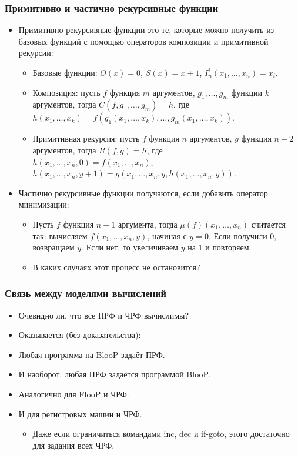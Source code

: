 \documentclass[10pt]{beamer}
\begin{document}
\begin{frame}
    \frametitle{Примитивно и частично рекурсивные функции}
    \begin{itemize}
        \item Примитивно рекурсивные функции это те, которые можно получить из базовых функций с помощью операторов композиции и примитивной рекурсии:
        \begin{itemize}
            \item Базовые функции: $O(x) = 0$, $S(x) = x+1$, $I_n^i(x_1, \ldots, x_n) = x_i$.
            \item Композиция: пусть $f$ функция $m$ аргументов, $g_1, \ldots, g_m$ функции $k$ аргументов, тогда $C(f, g_1, \ldots, g_m) = h$, где \\ $h(x_1, \ldots, x_k) = f(g_1(x_1, \ldots, x_k), \ldots, g_m(x_1, \ldots, x_k))$.
            \item Примитивная рекурсия: пусть $f$ функция $n$ аргументов, $g$ функция $n+2$ аргументов, тогда $R(f,g)=h$, где \\
            $h(x_1, \ldots, x_n,0) = f(x_1, \ldots, x_n)$, \\
            $h(x_1, \ldots, x_n,y+1) = g(x_1, \ldots, x_n, y, h(x_1, \ldots, x_n, y))$.
        \end{itemize}
        \pause
        \item Частично рекурсивные функции получаются, если добавить оператор минимизации:
        \begin{itemize}
            \item Пусть $f$ функция $n+1$ аргумента, тогда $\mu(f)(x_1, \ldots, x_n)$ считается так: вычисляем $f(x_1, \ldots, x_n, y)$, начиная с $y=0$. Если получили $0$, возвращаем $y$. Если нет, то увеличиваем $y$ на $1$ и повторяем.
            \item В каких случаях этот процесс не остановится?
        \end{itemize}
    \end{itemize}
\end{frame}

\begin{frame}
    \frametitle{Связь между моделями вычислений}
    \begin{itemize}
        \item Очевидно ли, что все ПРФ и ЧРФ вычислимы?
        \pause
        \item Оказывается (без доказательства):
        \item Любая программа на BlooP задаёт ПРФ.
        \item И наоборот, любая ПРФ задаётся программой BlooP.
        \pause
        \item Аналогично для FlooP и ЧРФ.
        \item И для регистровых машин и ЧРФ.
        \begin{itemize}
            \item Даже если ограничиться командами inc, dec и if-goto, этого достаточно для задания всех ЧРФ.
        \end{itemize}
    \end{itemize}
\end{frame}
\end{document}
